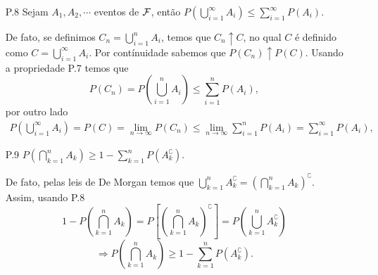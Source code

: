 \begin{frame}
\begin{enumerate}
 \item[P.8]  Sejam $ A_1, A_2, \cdots $ eventos de ${\cal F}$, então $ P\left( \bigcup_{i=1}^{\infty}A_i\right)\leq \sum_{i=1}^{\infty} P(A_i).$ 
 
 De fato,  se definimos $ C_n=\displaystyle \bigcup_{i=1}^{n}A_i $, temos que $ C_n\uparrow C $, no qual $C$ é definido como $ C= \bigcup_{i=1}^{\infty}A_i $. Por contínuidade sabemos que $ P(C_n)\uparrow P(C) $. Usando a propriedade P.7 temos que $$ P(C_n)= P\left(\displaystyle \bigcup_{i=1}^{n}A_i\right)\leq  \sum_{i=1}^{n} P(A_i),$$ por outro lado 
$$
\begin{aligned}
P\left( \bigcup_{i=1}^{\infty}A_i\right)= P(C)=\lim_{n\rightarrow \infty}P(C_n)  \leq\lim_{n\rightarrow \infty}\sum_{i=1}^{n} P(A_i)= \sum_{i=1}^{\infty} P(A_i),
\end{aligned}$$ 


\item[P.9]  $ P\left(\displaystyle \bigcap_{k=1}^{n} A_k\right)\geq 1- \displaystyle\sum_{k=1}^{n} P\left(A_{k}^\complement\right) $. 

De fato, pelas leis de De Morgan temos que 
$ \displaystyle \bigcup_{k=1}^{n}A_k^\complement=\left(\displaystyle\bigcap_{k=1}^{n}A_k\right)^\complement $. Assim, usando P.8 
$$1-P\left(\displaystyle\bigcap_{k=1}^{n}A_k\right) = P\left[\left(\displaystyle\bigcap_{k=1}^{n}A_k\right)^\complement\right] = P\left(\bigcup_{k=1}^{n}A_k^\complement\right)$$
$$\Rightarrow P\left(\displaystyle \bigcap_{k=1}^{n} A_k\right)\geq 1- \displaystyle\sum_{k=1}^{n} P\left(A_{k}^\complement\right).$$ 	
\end{enumerate}
\end{frame}

